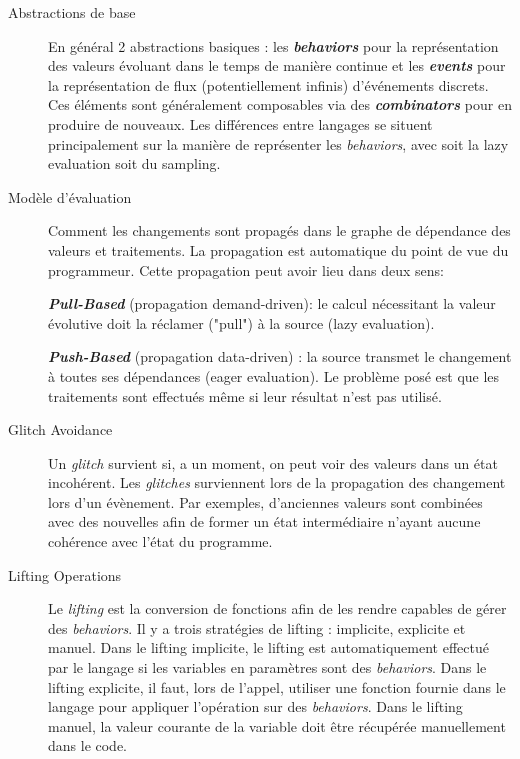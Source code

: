 \documentclass[10pt,final]{IEEEtran}
\begin{document}
\begin{description}
    \item[Abstractions de base]
    En général 2 abstractions basiques : les \textbf{\textit{behaviors}} pour la représentation des valeurs évoluant dans le temps de manière continue et les \textbf{\textit{events}} pour la représentation de flux (potentiellement infinis) d'événements discrets. Ces éléments sont généralement composables via des \textbf{\textit{combinators}} pour en produire de nouveaux. Les différences entre langages se situent principalement sur la manière de représenter les \textit{behaviors}, avec soit la lazy evaluation soit du sampling.
    
    \item[Modèle d'évaluation]
    Comment les changements sont propagés dans le graphe de dépendance des valeurs et traitements. La propagation est automatique du point de vue du programmeur. Cette propagation peut avoir lieu dans deux sens: 
    
    \textbf{\textit{Pull-Based}} (propagation demand-driven):  le calcul nécessitant la valeur évolutive doit la réclamer ("pull") à la source (lazy evaluation).
    
    \textbf{\textit{Push-Based}} (propagation data-driven) : la source transmet le changement à toutes ses dépendances (eager evaluation). Le problème posé est que les traitements sont effectués même si leur résultat n'est pas utilisé.
    
    \item[Glitch Avoidance]
    Un \textit{glitch} survient si, a un moment, on peut voir des valeurs dans un état incohérent. Les \textit{glitches} surviennent lors de la propagation des changement lors d'un évènement. Par exemples, d'anciennes valeurs sont combinées avec des nouvelles afin de former un état intermédiaire n'ayant aucune cohérence avec l'état du programme.
    
    \item[Lifting Operations]
    Le \textit{lifting} est la conversion de fonctions afin de les rendre capables de gérer des \textit{behaviors}. Il y a trois stratégies de lifting : implicite, explicite et manuel. Dans le lifting implicite, le lifting est automatiquement effectué par le langage si les variables en paramètres sont des \textit{behaviors}. Dans le lifting explicite, il faut, lors de l'appel, utiliser une fonction fournie dans le langage pour appliquer l'opération sur des \textit{behaviors}. Dans le lifting manuel, la valeur courante de la variable doit être récupérée manuellement dans le code.
    

\end{description}
\end{document}
